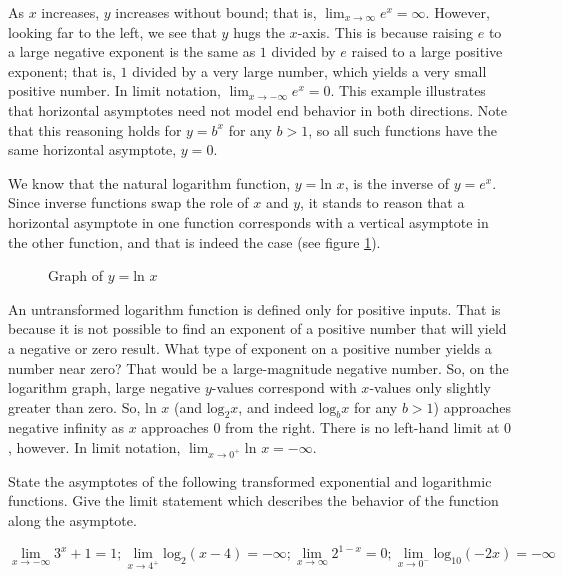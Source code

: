As $x$ increases, $y$ increases without bound; that is, $\lim_{x \rightarrow 
\infty} e^x = \infty$. However, looking far to the left, we see that $y$ hugs the 
$x$-axis. This is because raising $e$ to a large negative exponent is the same as 
$1$ divided by $e$ raised to a large positive exponent; that is, $1$ divided by a 
very large number, which yields a very small positive number. In limit notation, 
$\lim_{x \rightarrow -\infty} e^x = 0$. This example illustrates that horizontal 
asymptotes need not model end behavior in both directions. Note that this reasoning 
holds for $y = b^x$ for any $b > 1$, so all such functions have the same horizontal 
asymptote, $y = 0$.

We know that the natural logarithm function, $y = \text{ln } x$, is the inverse of 
$y = e^x$. Since inverse functions swap the role of $x$ and $y$, it stands to 
reason that a horizontal asymptote in one function corresponds with a vertical 
asymptote in the other function, and that is indeed the case (see figure 
\ref{fig:log}).

\begin{figure}[H]
  \centering
  \caption{Graph of \( y = \text{ln } x \)}
  \label{fig:log}
\end{figure}	

An untransformed logarithm function is defined only for positive inputs. That is 
because it is not possible to find an exponent of a positive number that will 
yield a negative or zero result. What type of exponent on a positive number yields 
a number near zero? That would be a large-magnitude negative number. So, on the 
logarithm graph, large negative $y$-values correspond with $x$-values only slightly 
greater than zero. So, $\text{ln } x$ (and $\text{log}_2 x$, and indeed 
$\text{log}_b x$ for any $b > 1$) approaches negative infinity as $x$ approaches 
$0$ from the right. There is no left-hand limit at $0$, however. In limit notation, 
$\lim_{x \rightarrow 0^+} \text{ln } x = -\infty$.

\begin{Exercise}[title=Limits Practice 2, label=limits2]
  State the asymptotes of the following transformed exponential and logarithmic 
  functions. Give the limit statement which describes the behavior of the function 
  along the asymptote.
  \vspace{40mm}
\end{Exercise}
\begin{Answer}[ref=limits2] 
	$$ \lim_{x \rightarrow -\infty} 3^x + 1 = 1; \lim_{x \rightarrow 4^+} 
	\text{log}_2 (x-4) = -\infty; \lim_{x \rightarrow \infty} 2^{1-x} = 0; \lim_{x 
	\rightarrow 0^-} \text{log}_{10} (-2x) = -\infty $$
\end{Answer}

